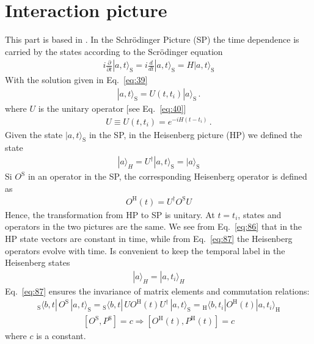 \section{Interaction picture}
\label{sec:interaction-picture}
This part is based in \cite{Mandl:1985bg}. 
In the Schr\"odinger Picture (SP) the time dependence is carried by the states according to the Scr\"odinger equation 
\begin{align}
\label{eq:84}
  i\frac{\partial}{\partial t}|a,t\rangle_{\text{S}}=  i\frac{d}{dt}|a,t\rangle_{\text{S}}=  {H}|a,t\rangle_{\text{S}}
\end{align}
With the solution given in Eq.~\eqref{eq:39}
\begin{align}
\label{eq:85}
    |a,t\rangle_{\text{S}}=U(t,t_i)|a\rangle_{\text{S}}\,.
\end{align}
where $U$ is the unitary operator [see Eq.~\eqref{eq:40}]
\begin{align}
 U\equiv U(t,t_i)= e^{-i H(t-t_i)}\,.
\end{align}
Given the state $|a,t\rangle_{\text{S}}$ in the SP, in the Heisenberg picture (HP) we defined the state
\begin{align}
\label{eq:86}
  |a\rangle_H=U^\dagger|a,t\rangle_{\text{S}}=|a\rangle_{\text{S}}
\end{align}
Si $O^{\text{S}}$ in an operator in the SP, the corresponding Heisenberg operator is defined as
\begin{align}
\label{eq:87}
  O^{\text{H}}(t)=U^\dagger O^{\text{S}}U
\end{align}
Hence, the transformation from HP to SP is unitary. At $t=t_i$, states and operators in the two pictures are the same. We see from Eq.~\eqref{eq:86} that in the HP state vectors are constant in time, while from Eq.~\eqref{eq:87} the Heisenberg operators evolve with time. Is convenient to keep the temporal label in the Heisenberg states
\begin{align}
  |a\rangle_H=|a,t_i\rangle_H
\end{align}
Eq.~\eqref{eq:87} ensures the invariance of matrix elements and commutation relations:
\begin{align}
  {}_{\text{S}}\langle b,t|\,O^{\text{S}}\,|a,t\rangle_{\text{S}}=  {}_{\text{S}}\langle b,t|\,U O^{\text{H}}(t) U^\dagger\,|a,t\rangle_{\text{S}}=
{}_{\text{H}}\langle b,t_i|O^{\text{H}}(t)|a,t_i\rangle_{\text{H}}
\end{align}
\begin{align}
\left[O^{\text{S}},P^{\text{S}}\right]=c\Rightarrow\left[O^{\text{H}}(t),P^{\text{H}}(t)\right]=c
\end{align}
where $c$ is a constant.

